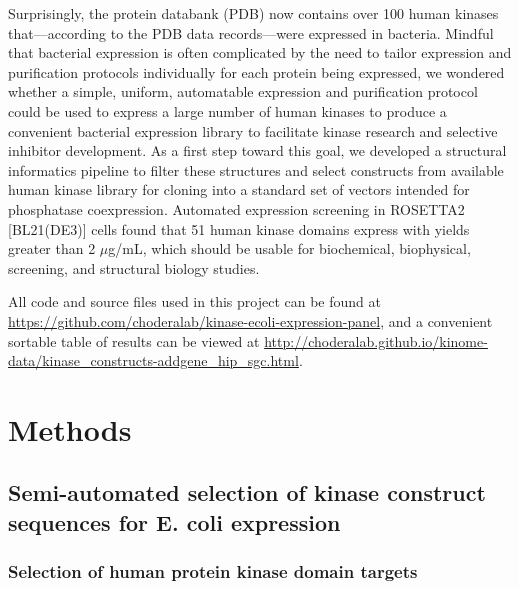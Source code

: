 \documentclass[aps,pre,twocolumn,nofootinbib,superscriptaddress,linenumbers]{revtex4-1}
\begin{document}
Surprisingly, the protein databank (PDB) now contains over 100 human kinases that---according to the PDB data records---were expressed in bacteria.
Mindful that bacterial expression is often complicated by the need to tailor expression and purification protocols individually for each protein being expressed, we wondered whether a simple, uniform, automatable expression and purification protocol could be used to express a large number of human kinases to produce a convenient bacterial expression library to facilitate kinase research and selective inhibitor development.
As a first step toward this goal, we developed a structural informatics pipeline to filter these structures and select constructs from available human kinase library for cloning into a standard set of vectors intended for phosphatase coexpression.
Automated expression screening in ROSETTA2 [BL21(DE3)] cells found that 51 human kinase domains express with yields greater than 2 $\mu$g/mL, which should be usable for biochemical, biophysical, screening, and structural biology studies.

All code and source files used in this project can be found at \url{https://github.com/choderalab/kinase-ecoli-expression-panel}, and a convenient sortable table of results can be viewed at \url{http://choderalab.github.io/kinome-data/kinase\_constructs-addgene\_hip\_sgc.html}.

\section{Methods}
\label{section:methods}

\subsection{Semi-automated selection of kinase construct sequences for E. coli expression}

\subsubsection{Selection of human protein kinase domain targets}
\end{document}
